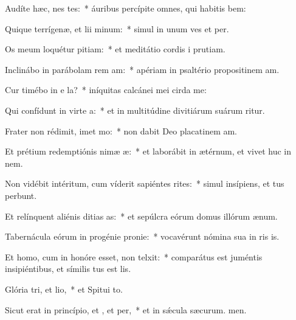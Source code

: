 \item Audíte hæc, nes tes:~* áuribus percípite omnes, qui habitis bem:
\item Quique terrígenæ, et lii minum:~* simul in unum ves et per.
\item Os meum loquétur pitiam:~* et meditátio cordis i prutiam.
\item Inclinábo in parábolam rem am:~* apériam in psaltério propositinem am.
\item Cur timébo in e la?~* iníquitas calcánei mei cirda me:
\item Qui confídunt in virte a:~* et in multitúdine divitiárum suárum ritur.
\item Frater non rédimit, imet mo:~* non dabit Deo placatinem am.
\item Et prétium redemptiónis nimæ æ:~* et laborábit in ætérnum, et vivet huc in nem.
\item Non vidébit intéritum, cum víderit sapiéntes rites:~* simul insípiens, et tus perbunt.
\item Et relínquent aliénis ditias as:~* et sepúlcra eórum domus illórum  ænum.
\item Tabernácula eórum in progénie  pronie:~* vocavérunt nómina sua in ris is.
\item Et homo, cum in honóre esset, non telxit:~* comparátus est juméntis insipiéntibus, et símilis tus est lis.
\item Glória tri, et lio,~* et Spitui to.
\item Sicut erat in princípio, et , et per,~* et in sǽcula sæcurum. men.
